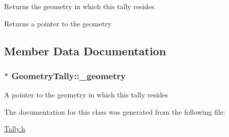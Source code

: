 Returns the geometry in which this tally resides. 

\begin{DoxyReturn}{Returns}
a pointer to the geometry 
\end{DoxyReturn}


\subsection{Member Data Documentation}
\hypertarget{classGeometryTally_ab2ed248e810a207e6037017a01b757f5}{
\subsubsection[{\-\_\-geometry}]{$\ast$ Geometry\-Tally\-::\-\_\-geometry\hspace{0.3cm}{\ttfamily [protected]}}}\label{classGeometryTally_ab2ed248e810a207e6037017a01b757f5}
A pointer to the geometry in which this tally resides 

The documentation for this class was generated from the following file\-:\begin{DoxyCompactItemize}
\item 
\hyperlink{Tally_8h}{Tally.\-h}\end{DoxyCompactItemize}

